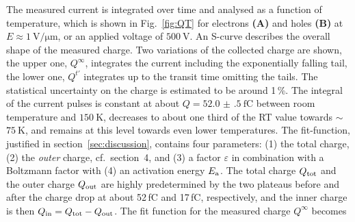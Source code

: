 The measured current is integrated over time and analysed as a function of temperature, which is shown in 
 Fig.~\ref{fig:QT} for electrons \textbf{(A)} and holes \textbf{(B)} at $E \approx \SI{1}{\volt/\micro\meter}$, or an applied voltage of $\SI{500}{\volt}$. 
An S-curve describes the overall shape of the measured charge. 
Two variations of the collected charge are shown, the upper one, $Q^{\infty}$, integrates the current including the exponentially falling tail,
 the lower one, $Q^{t'}$ integrates up to the transit time omitting the tails. 
The statistical uncertainty on the charge is estimated to be around 1\,\%. 
The integral of the current pulses is constant at about $Q = \SI{52.0(5)}{\femto\coulomb}$ between room temperature and $\SI{150}{\kelvin}$,
 decreases to about one third of the RT value towards $\sim$ $\SI{75}{\kelvin}$, and remains at this level towards even lower temperatures.
The fit-function, justified in section~\ref{sec:discussion}, contains four parameters: (1) the total charge, (2) the \textit{outer} charge, cf.\ section~4, and (3) a factor $\varepsilon$ in combination with a
 Boltzmann factor %
 with (4) an activation energy $E_{\textrm{a}}$. 
The total charge $Q_{\textrm{tot}}$ and the outer charge $Q_{\textrm{out}}$ are highly predetermined by the two plateaus before and after the charge drop at about 52\,fC and 17\,fC, respectively, 
 and the inner charge is then $Q_{\textrm{in}} = Q_{\textrm{tot}} - Q_{\textrm{out}}$. 
The fit function for the measured charge $Q^{\infty}$ becomes

